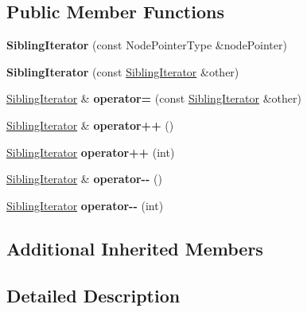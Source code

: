 \subsection*{Public Member Functions}
\begin{DoxyCompactItemize}
\item 
\mbox{\label{classSiblingIterator_aa8eb8801d45199da378d3ca5900a9211}} 
{\bfseries Sibling\+Iterator} (const Node\+Pointer\+Type \&node\+Pointer)
\item 
\mbox{\label{classSiblingIterator_a0a6d63b9bec268c958c02d340c55cbc6}} 
{\bfseries Sibling\+Iterator} (const \mbox{\hyperlink{classSiblingIterator}{Sibling\+Iterator}} \&other)
\item 
\mbox{\label{classSiblingIterator_a68c9d52fe831a1518aea46da74fc419f}} 
\mbox{\hyperlink{classSiblingIterator}{Sibling\+Iterator}} \& {\bfseries operator=} (const \mbox{\hyperlink{classSiblingIterator}{Sibling\+Iterator}} \&other)
\item 
\mbox{\label{classSiblingIterator_a19014ac46bce2d3fdbcb30701bf6c4a4}} 
\mbox{\hyperlink{classSiblingIterator}{Sibling\+Iterator}} \& {\bfseries operator++} ()
\item 
\mbox{\label{classSiblingIterator_a5bf3b584c0dce03c7ab527f139127d80}} 
\mbox{\hyperlink{classSiblingIterator}{Sibling\+Iterator}} {\bfseries operator++} (int)
\item 
\mbox{\label{classSiblingIterator_afaffed26984ce38005c4ef2d2421efd7}} 
\mbox{\hyperlink{classSiblingIterator}{Sibling\+Iterator}} \& {\bfseries operator-\/-\/} ()
\item 
\mbox{\label{classSiblingIterator_a5ecba5d48878dd0ad998d90dd20a6e54}} 
\mbox{\hyperlink{classSiblingIterator}{Sibling\+Iterator}} {\bfseries operator-\/-\/} (int)
\end{DoxyCompactItemize}
\subsection*{Additional Inherited Members}


\subsection{Detailed Description}
